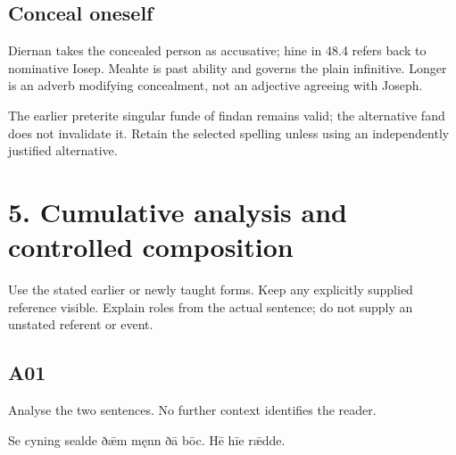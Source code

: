 \subsection*{Conceal oneself}

Diernan takes the concealed person as accusative; hine in 48.4 refers back to nominative Iosep. Meahte is past ability and governs the plain infinitive. Longer is an adverb modifying concealment, not an adjective agreeing with Joseph.

The earlier preterite singular funde of findan remains valid; the alternative fand does not invalidate it. Retain the selected spelling unless using an independently justified alternative.

\section*{5. Cumulative analysis and controlled composition}

Use the stated earlier or newly taught forms. Keep any explicitly supplied reference visible. Explain roles from the actual sentence; do not supply an unstated referent or event.

\subsection*{A01}

Analyse the two sentences. No further context identifies the reader.

Se cyning sealde ðǣm męnn ðā bōc. Hē hīe rǣdde.


